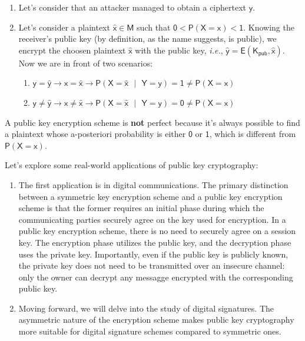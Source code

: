 \documentclass{article}
\newcounter{definition}[section]
\begin{document}
\begin{enumerate}
    \item Let's consider that an attacker managed to obtain a ciphertext $\mathsf{y}$. 
    \item Let's consider a plaintext $\mathsf{\hat{x} \in M}$ such that $\mathsf{0 < P(X = x) < 1}$. Knowing the receiver's public key (by definition, as the name suggests, is public), we encrypt the choosen plaintext $\mathsf{\hat{x}}$ with the public key, \textit{i.e.}, $\mathsf{\hat{y} = E(K_{pub}, \hat{x})}$. Now we are in front of two scenarios:
    \begin{enumerate}
        \item $\mathsf{y = \hat{y} \rightarrow x = \hat{x} \rightarrow P(X = \hat{x} \text{ } | \text{ } Y = y) = 1 \neq P(X = x)}$
        \item $\mathsf{y \neq \hat{y} \rightarrow x \neq \hat{x} \rightarrow P(X = \hat{x} \text{ } | \text{ } Y = y) = 0 \neq P(X = x)}$
    \end{enumerate}
\end{enumerate}

\begin{boxH}
    A public key encryption scheme is \textbf{not} perfect because it's always possible to find a plaintext whose a-posteriori probability is either $\mathsf{0}$ or $\mathsf{1}$, which is different from $\mathsf{P(X=x)}$.
\end{boxH}

\par \noindent Let's explore some real-world applications of public key cryptography:

\begin{enumerate}
    \item The first application is in digital communications. The primary distinction between a symmetric key encryption scheme and a public key encryption scheme is that the former requires an initial phase during which the communicating parties securely agree on the key used for encryption. In a public key encryption scheme, there is no need to securely agree on a session key. The encryption phase utilizes the public key, and the decryption phase uses the private key. Importantly, even if the public key is publicly known, the private key does not need to be transmitted over an insecure channel: only the owner can decrypt any messagge encrypted with the corresponding public key.
    \item Moving forward, we will delve into the study of digital signatures. The asymmetric nature of the encryption scheme makes public key cryptography more suitable for digital signature schemes compared to symmetric ones.
\end{enumerate}
\end{document}
